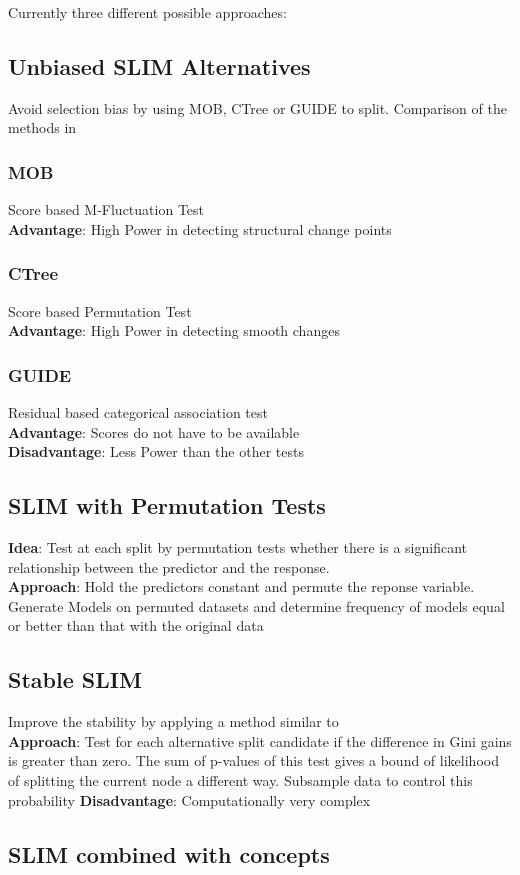 Currently three different possible approaches:
\subsection{Unbiased SLIM Alternatives}
Avoid selection bias by using MOB, CTree or GUIDE to split.
Comparison of the methods in \citep{Schlosser.24.06.2019}

\subsubsection{MOB}
Score based M-Fluctuation Test \\
\textbf{Advantage}: High Power in detecting structural change points
\subsubsection{CTree}
Score based Permutation Test \\
\textbf{Advantage}: High Power in detecting smooth changes

\subsubsection{GUIDE}
Residual based categorical association test\\
\textbf{Advantage}: Scores do not have to be available\\
\textbf{Disadvantage}: Less Power than the other tests




\subsection{SLIM with Permutation Tests}
\textbf{Idea}: \citep{.4581}
Test at each split by permutation tests whether there is a significant relationship between the predictor and the response.\\
\textbf{Approach}: Hold the predictors constant and permute the reponse variable. Generate Models on permuted datasets and determine frequency of models equal or better than that with the original data\\

\subsection{Stable SLIM}
Improve the stability by applying a method similar to \citep{Zhou.2018}\\
\textbf{Approach}: Test for each alternative split candidate if the difference in Gini gains is greater than zero. The sum of p-values of this test gives a bound of likelihood of  splitting the current node a different way. Subsample data to control this probability
\textbf{Disadvantage}:  Computationally very complex


\subsection{SLIM combined with concepts}
\citep{Renard.2019}
